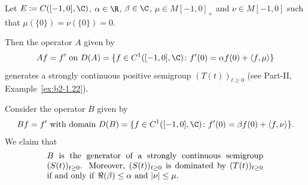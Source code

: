 \begin{example}\label{ex:c2-4.14}
Let $E \coloneq C([-1,0],\C)$, $\alpha \in \R$, $\beta \in \C$, $\mu \in M[-1,0]_{+}$
and $\nu \in M[-1,0]$ such that $\mu(\{0\}) = \nu(\{0\}) = 0$.

Then the operator $A$ given by 
\[
Af = f' \text{ on } D(A) = \{f \in C^{1}([-1,0],\C) \colon f'(0) = \alpha f(0) + \langle f,\mu\rangle\}
\]
generates a strongly continuous positive semigroup $(T(t))_{t \geq 0}$ 
(see Part-II, Example~\ref{ex:b2-1.22}).

Consider the operator $B$ given by
\[Bf = f' \text{ with domain } D(B) = \{f \in C^{1}([-1,0],\C) \colon f'(0) = \beta f(0) + \langle f,\nu \rangle\}.
\]
We claim that
\begin{equation}\label{eq:c2-4.13}
\begin{minipage}{.75\textwidth}
$ B $ is the generator of a strongly continuous semigroup  $(S(t))_{t \geq 0}$.
Moreover,  $(S(t))_{t \geq 0}$ is dominated by  $(T(t))_{t \geq 0}$ 
if and only if\/ $\Re(\beta) \leq \alpha$ and  $|\nu| \leq \mu$.
\end{minipage}
\end{equation}
\end{example}
